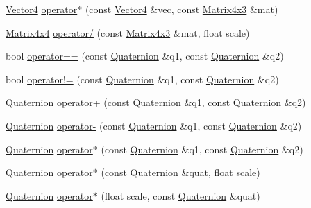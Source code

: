 \begin{DoxyCompactItemize}
\item 
\mbox{\hyperlink{struct_math_1_1_vector4}{Vector4}} \mbox{\hyperlink{namespace_math_ad610b35195c92a20ff2913aaa5c14f4c}{operator$\ast$}} (const \mbox{\hyperlink{struct_math_1_1_vector4}{Vector4}} \&vec, const \mbox{\hyperlink{struct_math_1_1_matrix4x3}{Matrix4x3}} \&mat)
\item 
\mbox{\hyperlink{struct_math_1_1_matrix4x4}{Matrix4x4}} \mbox{\hyperlink{namespace_math_a015e4eb983da8ccc218796edddd145ff}{operator/}} (const \mbox{\hyperlink{struct_math_1_1_matrix4x3}{Matrix4x3}} \&mat, float scale)
\item 
bool \mbox{\hyperlink{namespace_math_a9180235433724422d304ae5bb9c96654}{operator==}} (const \mbox{\hyperlink{struct_math_1_1_quaternion}{Quaternion}} \&q1, const \mbox{\hyperlink{struct_math_1_1_quaternion}{Quaternion}} \&q2)
\item 
bool \mbox{\hyperlink{namespace_math_a2018345b202259554f37833e2ad4f368}{operator!=}} (const \mbox{\hyperlink{struct_math_1_1_quaternion}{Quaternion}} \&q1, const \mbox{\hyperlink{struct_math_1_1_quaternion}{Quaternion}} \&q2)
\item 
\mbox{\hyperlink{struct_math_1_1_quaternion}{Quaternion}} \mbox{\hyperlink{namespace_math_aa4702dd289093f85efd2ce191d042773}{operator+}} (const \mbox{\hyperlink{struct_math_1_1_quaternion}{Quaternion}} \&q1, const \mbox{\hyperlink{struct_math_1_1_quaternion}{Quaternion}} \&q2)
\item 
\mbox{\hyperlink{struct_math_1_1_quaternion}{Quaternion}} \mbox{\hyperlink{namespace_math_ae4d4050d108be2ff9bbaacbd613cbf48}{operator-\/}} (const \mbox{\hyperlink{struct_math_1_1_quaternion}{Quaternion}} \&q1, const \mbox{\hyperlink{struct_math_1_1_quaternion}{Quaternion}} \&q2)
\item 
\mbox{\hyperlink{struct_math_1_1_quaternion}{Quaternion}} \mbox{\hyperlink{namespace_math_adf16f62e56ee18741a93b0db7a555fe2}{operator$\ast$}} (const \mbox{\hyperlink{struct_math_1_1_quaternion}{Quaternion}} \&q1, const \mbox{\hyperlink{struct_math_1_1_quaternion}{Quaternion}} \&q2)
\item 
\mbox{\hyperlink{struct_math_1_1_quaternion}{Quaternion}} \mbox{\hyperlink{namespace_math_a7a53d7e378ecb1c87b7a9fa0745de29f}{operator$\ast$}} (const \mbox{\hyperlink{struct_math_1_1_quaternion}{Quaternion}} \&quat, float scale)
\item 
\mbox{\hyperlink{struct_math_1_1_quaternion}{Quaternion}} \mbox{\hyperlink{namespace_math_a10e62d95a67155ffedb323e468943905}{operator$\ast$}} (float scale, const \mbox{\hyperlink{struct_math_1_1_quaternion}{Quaternion}} \&quat)

\end{DoxyCompactItemize}
